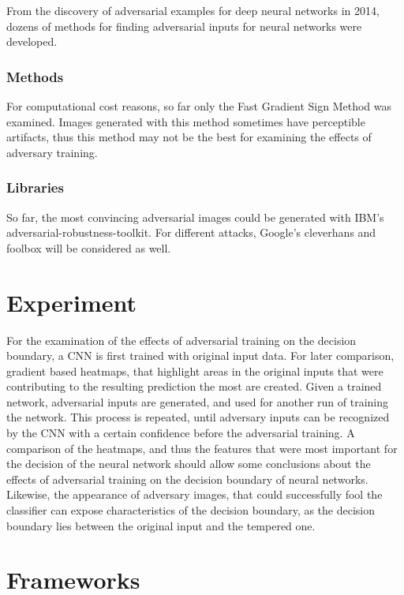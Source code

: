 \documentclass[draft,final]{vutinfth} %
\begin{document}
From the discovery of adversarial examples for deep neural networks in 2014, dozens of methods for finding adversarial inputs for neural networks were developed.

\subsubsection{Methods}
For computational cost reasons, so far only the Fast Gradient Sign Method was examined. Images generated with this method sometimes have perceptible artifacts, thus this method may not be the best for examining the effects of adversary training.

\subsubsection{Libraries}

So far, the most convincing adversarial images could be generated with IBM's adversarial-robustness-toolkit. For different attacks, Google's cleverhans and foolbox will be considered as well.

\section{Experiment}

For the examination of the effects of adversarial training on the decision boundary, a CNN is first trained with original input data. For later comparison, gradient based heatmaps, that highlight areas in the original inputs
that were contributing to the resulting prediction the most are created. Given a trained network, adversarial inputs are generated, and used for another run of training the network. This process is repeated, until adversary
inputs can be recognized by the CNN with a certain confidence before the adversarial training. 
A comparison of the heatmaps, and thus the features that were most important for the decision of the neural network should allow some conclusions about the effects of adversarial training on the decision boundary of neural networks. Likewise,
the appearance of adversary images, that could successfully fool the classifier can expose characteristics of the decision boundary, as the decision boundary lies between the original input and the tempered one.

\section{Frameworks}
\end{document}
